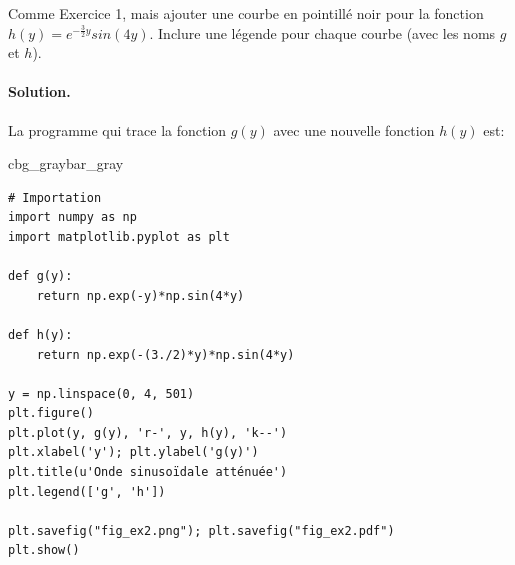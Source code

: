 \documentclass[%
oneside,                 %
final,                   %
10pt,french]{article}
\newenvironment{_pro_tight}[2]{
   \def\FrameCommand{\color{#2}\vrule width 1mm\normalcolor\colorbox{#1}}
   \FrameRule0.6pt\MakeFramed {\advance\hsize-2mm\FrameRestore}\vskip3mm}
   {\vskip0mm\endMakeFramed}
\newenvironment{pro}[2]{
\bgroup\rmfamily
\fboxsep=0mm\relax
\begin{_pro_tight}{#1}{#2}
\list{}{\parsep=-2mm\parskip=0mm\topsep=0pt\leftmargin=2mm
\rightmargin=2\leftmargin\leftmargin=4pt\relax}
\item\relax}
{\endlist\end{_pro_tight}\egroup}
\newenvironment{doconceexercise}{}{}
\newcounter{doconceexercisecounter}
\begin{document}
\begin{doconceexercise}



Comme Exercice 1, mais ajouter une courbe en pointillé noir pour la fonction $h(y) = e^{-\frac{3}{2}y} sin(4y)$. Inclure une légende pour chaque courbe (avec les noms $g$ et $h$).


\paragraph{Solution.}
La programme qui trace la fonction $g(y)$ avec une nouvelle fonction $h(y)$ est:
\begin{pro}{cbg_gray}{bar_gray}\begin{verbatim}
# Importation
import numpy as np
import matplotlib.pyplot as plt

def g(y):
    return np.exp(-y)*np.sin(4*y)

def h(y):
    return np.exp(-(3./2)*y)*np.sin(4*y)

y = np.linspace(0, 4, 501)
plt.figure()
plt.plot(y, g(y), 'r-', y, h(y), 'k--')
plt.xlabel('y'); plt.ylabel('g(y)')
plt.title(u'Onde sinusoïdale atténuée')
plt.legend(['g', 'h'])

plt.savefig("fig_ex2.png"); plt.savefig("fig_ex2.pdf")
plt.show()
\end{verbatim}
\end{pro}
\noindent




\end{doconceexercise}
\end{document}
